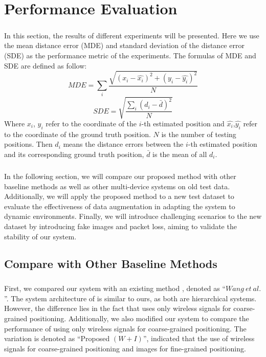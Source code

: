 \documentclass[a4paper,12pt]{report}
\begin{document}
\chapter{Performance Evaluation}
\paragraph{}
In this section, the results of different experiments will be presented. Here we use the mean distance error (MDE) and standard
deviation of the distance error (SDE) as the performance metric of the experiments. The formulas of MDE and SDE are defined as follow:
\begin{equation}
    \label{Eq:mde}
    MDE=\sum_i{\frac{\sqrt{(x_i-\hat{x_i})^2+(y_i-\hat{y_i})^2}}{N}}
\end{equation}
\begin{equation}
    SDE = \sqrt{\frac{\sum_{i}{(d_i-\bar{d})}^2}{N}}
\end{equation}
Where $x_i$, $y_i$ refer to the coordinate of the $i$-th estimated position and $\hat{x_i}$,$\hat{y_i}$ refer to the coordinate of the ground truth position. $N$ is the number of testing positions. Then $d_i$ means the distance errors between the $i$-th estimated position and its corresponding ground truth position, $\bar{d}$ is the mean of all $d_i$.
\paragraph{}
In the following section, we will compare our proposed method with other baseline methods as well as other multi-device systems on old test data. Additionally, we will apply the proposed method to a new test dataset to evaluate the effectiveness of data augmentation in adapting the system to dynamic environments. Finally, we will introduce challenging scenarios to the new dataset by introducing fake images and packet loss, aiming to validate the stability of our system.
\section{Compare with Other Baseline Methods}
\paragraph{}
First, we compared our system with an existing method \cite{wang2020joint}, denoted as ``$Wang\ et\ al.$''. The system architecture of \cite{wang2020joint} is similar to ours, as both are hierarchical systems. However, the difference lies in the fact that \cite{wang2020joint} uses only wireless signals for coarse-grained positioning. Additionally, we also modified our system to compare the performance of using only wireless signals for coarse-grained positioning. The variation is denoted as ``Proposed $(W+I)$'', indicated that the use of wireless signals for coarse-grained positioning and images for fine-grained positioning.
\end{document}
